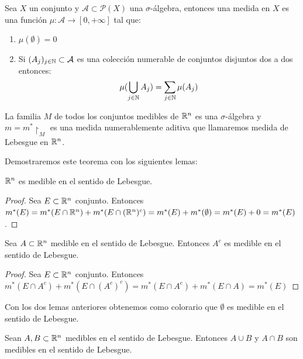 \label{Medida}
\begin{definición}
Sea $X$ un conjunto y $\mathcal{A} \subset \mathcal{P}(X)$ una $\sigma$-álgebra, entonces una medida en $X$ es una función $\mu: \mathcal{A} \to [0, +\infty]$ tal que:
\begin{enumerate}
    \item $\mu(\emptyset) = 0$
    \item Si $(A_j)_{j \in \mathbb{N}} \subset \mathcal{A}$ es una colección numerable de
          conjuntos disjuntos dos a dos entonces: $$\mu(\bigcup_{j \in \mathbb{N}} A_j) = \sum_{j
                  \in \mathbb{N}} \mu(A_j)$$
\end{enumerate}
\end{definición}

\begin{teorema}
    La familia $M$ de todos los conjuntos medibles de $\mathbb{R}^n$ es una $\sigma$-álgebra y $m = m^* \restriction_M$ es una medida numerablemente aditiva que llamaremos medida de Lebesgue en $\mathbb{R}^n$.
\end{teorema}

Demostraremos este teorema con los siguientes lemas:

\begin{lema}
    $\mathbb{R}^n$ es medible en el sentido de Lebesgue.
\end{lema}

\begin{proof}
    Sea $E \subset \mathbb{R}^n$ conjunto. Entonces $m^*(E) = m^*(E \cap \mathbb{R}^n) + m^*(E \cap (\mathbb{R}^n)^c) = m^*(E) + m^*(\emptyset) = m^*(E) + 0 = m^*(E)$.
\end{proof}

\begin{lema}
    Sea $A \subset \mathbb{R}^n$ medible en el sentido de Lebesgue. Entonces $A^c$ es medible en el sentido de Lebesgue.
\end{lema}

\begin{proof}
    Sea $E \subset \mathbb{R}^n$ conjunto. Entonces $m^*(E \cap A^c) + m^*(E \cap (A^c)^c) = m^*(E \cap A^c) + m^*(E \cap A) = m^*(E)$
\end{proof}

Con los dos lemas anteriores obtenemos como colorario que $\emptyset$ es
medible en el sentido de Lebesgue.

\begin{lema}
    Sean $A, B \subset \mathbb{R}^n$ medibles en el sentido de Lebesgue. Entonces $A \cup B$ y $A \cap B$ son medibles en el sentido de Lebesgue.
\end{lema}

